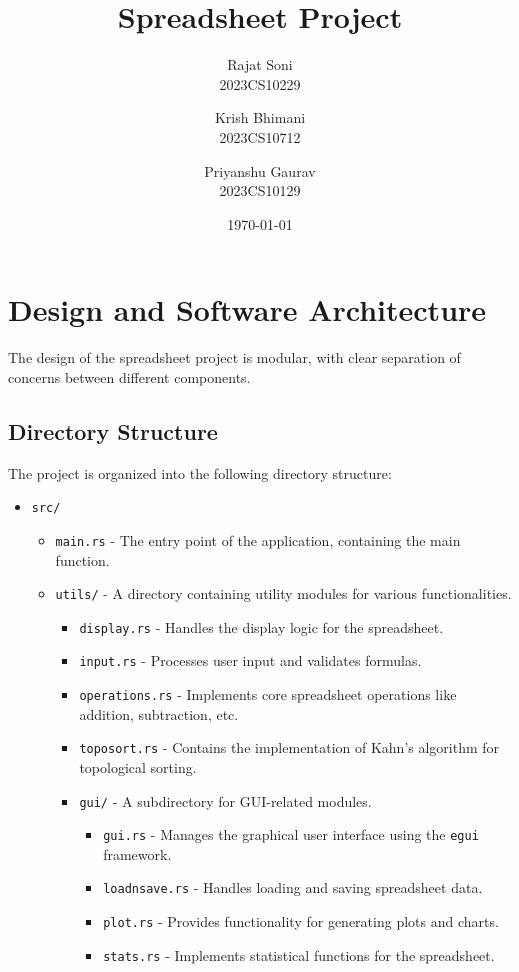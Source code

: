 \documentclass{article}
\title{Spreadsheet Project}
\author{
    Rajat Soni \\ {\small 2023CS10229} \\
    \and
    Krish Bhimani \\ {\small 2023CS10712} \\
    \and
    Priyanshu Gaurav \\ {\small 2023CS10129}
}
\date{\today}
\begin{document}
\maketitle
\tableofcontents
\pagebreak
\section{Design and Software Architecture}
The design of the spreadsheet project is modular, with clear separation of concerns between different components.
\subsection{Directory Structure}
The project is organized into the following directory structure:

\begin{itemize}
    \item \texttt{src/}
    \begin{itemize}
        \item \texttt{main.rs} - The entry point of the application, containing the main function.
        \item \texttt{utils/} - A directory containing utility modules for various functionalities.
        \begin{itemize}
            \item \texttt{display.rs} - Handles the display logic for the spreadsheet.
            \item \texttt{input.rs} - Processes user input and validates formulas.
            \item \texttt{operations.rs} - Implements core spreadsheet operations like addition, subtraction, etc.
            \item \texttt{toposort.rs} - Contains the implementation of Kahn's algorithm for topological sorting.
            \item \texttt{gui/} - A subdirectory for GUI-related modules.
            \begin{itemize}
                \item \texttt{gui.rs} - Manages the graphical user interface using the \texttt{egui} framework.
                \item \texttt{loadnsave.rs} - Handles loading and saving spreadsheet data.
                \item \texttt{plot.rs} - Provides functionality for generating plots and charts.
                \item \texttt{stats.rs} - Implements statistical functions for the spreadsheet.

\end{itemize}
\end{itemize}
\end{itemize}
\end{itemize}
\end{document}
